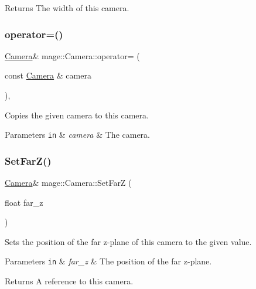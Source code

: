 \begin{DoxyReturn}{Returns}
The width of this camera. 
\end{DoxyReturn}
\hypertarget{classmage_1_1_camera_a6a5d3006100ba608f1b06b976f20a430}{}\label{classmage_1_1_camera_a6a5d3006100ba608f1b06b976f20a430} 
\subsubsection{\texorpdfstring{operator=()}{operator=()}}
{\footnotesize\ttfamily \hyperlink{classmage_1_1_camera}{Camera}\& mage\+::\+Camera\+::operator= (\begin{DoxyParamCaption}\item[{const \hyperlink{classmage_1_1_camera}{Camera} \&}]{camera }\end{DoxyParamCaption})\hspace{0.3cm}{\ttfamily [private]}, {\ttfamily [delete]}}

Copies the given camera to this camera.


\begin{DoxyParams}[1]{Parameters}
\mbox{\tt in}  & {\em camera} & The camera. \\
\hline
\end{DoxyParams}
\hypertarget{classmage_1_1_camera_acd1ab15368f052b846f72b92a52a94c5}{}\label{classmage_1_1_camera_acd1ab15368f052b846f72b92a52a94c5} 
\subsubsection{\texorpdfstring{Set\+Far\+Z()}{SetFarZ()}}
{\footnotesize\ttfamily \hyperlink{classmage_1_1_camera}{Camera}\& mage\+::\+Camera\+::\+Set\+FarZ (\begin{DoxyParamCaption}\item[{float}]{far\+\_\+z }\end{DoxyParamCaption})}

Sets the position of the far z-\/plane of this camera to the given value.


\begin{DoxyParams}[1]{Parameters}
\mbox{\tt in}  & {\em far\+\_\+z} & The position of the far z-\/plane. \\
\hline
\end{DoxyParams}
\begin{DoxyReturn}{Returns}
A reference to this camera. 
\end{DoxyReturn}
\hypertarget{classmage_1_1_camera_a83ab1d3345b3fc318608c016b6b523d9}{}\label{classmage_1_1_camera_a83ab1d3345b3fc318608c016b6b523d9} 
